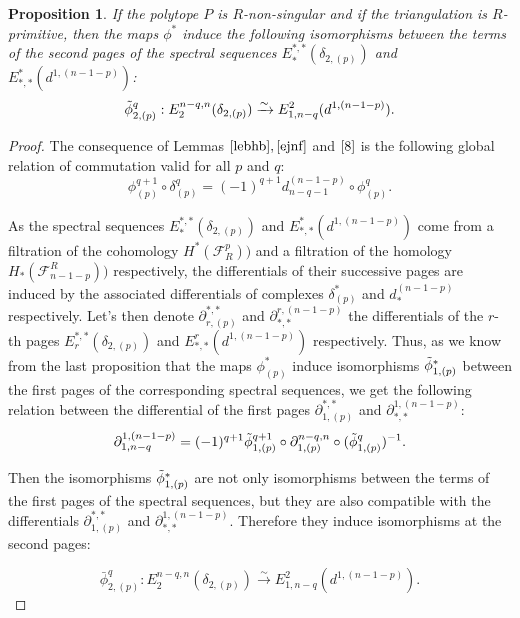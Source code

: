 \documentclass{article}
\newtheorem{proposition}{Proposition}
\begin{document}
\begin{proposition}
    If the polytope $P$ is $R$-non-singular and if the triangulation is $R$-primitive, then the maps $\phi^*$ induce the following isomorphisms between the terms of the second pages of the spectral sequences $E_*^{*,*}(\delta_{2,(p)})$ and $E^*_{*,*}(d^{1,(n-1-p)})$:
    \begin{equation*}
        \Tilde{\phi}^q_{2,(p)}: E_2^{n-q,n}(\delta_{2,(p)}) \xrightarrow{\sim} E^2_{1,n-q}(d^{1,(n-1-p)}).
    \end{equation*}
    \label{11}
\end{proposition}

\begin{proof}
    The consequence of Lemmas $\ref{lebhb},\ref{ejnf}$ and $\ref{8}$ is the following global relation of commutation valid for all $p$ and $q$:
    \begin{equation*}
        \phi^{q+1}_{(p)} \circ \delta_{(p)}^q = (-1)^{q+1}d^{(n-1-p)}_{n-q-1} \circ \phi^q_{(p)}.
    \end{equation*}
    
    As the spectral sequences $E_*^{*,*}(\delta_{2,(p)})$ and $E^*_{*,*}(d^{1,(n-1-p)})$ come from a filtration of the cohomology $H^*(\mathcal{F}^p_R))$ and a filtration of the homology $H_*(\mathcal{F}_{n-1-p}^R))$ respectively, the differentials of their successive pages are induced by the associated differentials of complexes $\delta_{(p)}^*$ and $d^{(n-1-p)}_*$ respectively. Let's then denote $\partial_{r,(p)}^{*,*}$ and $\partial^{r,(n-1-p)}_{*,*}$ the differentials of the $r$-th pages $E_r^{*,*}(\delta_{2,(p)})$ and $E^r_{*,*}(d^{1,(n-1-p)})$ respectively. Thus, as we know from the last proposition that the maps $\phi^*_{(p)}$ induce isomorphisms $\Tilde{\phi}^*_{1,(p)}$ between the first pages of the corresponding spectral sequences, we get the following relation between the differential of the first pages $\partial_{1,(p)}^{*,*}$ and $\partial^{1,(n-1-p)}_{*,*}$:
    \begin{equation*}
        \partial^{1,(n-1-p)}_{1,n-q} = (-1)^{q+1} \Tilde{\phi}^{q+1}_{1,(p)}\circ \partial_{1,(p)}^{n-q,n} \circ (\Tilde{\phi}^q_{1,(p)})^{-1}.
    \end{equation*}

    Then the isomorphisms $\Tilde{\phi}^*_{1,(p)}$ are not only isomorphisms between the terms of the first pages of the spectral sequences, but they are also compatible with the differentials $\partial_{1,(p)}^{*,*}$ and $\partial^{1,(n-1-p)}_{*,*}$. Therefore they induce isomorphisms at the second pages:

    \begin{equation*}
        \bar{\phi}^q_{2,(p)}: E_2^{n-q,n}(\delta_{2,(p)}) \xrightarrow{\sim} E^2_{1,n-q}(d^{1,(n-1-p)}).
    \end{equation*}
\end{proof}
\end{document}
